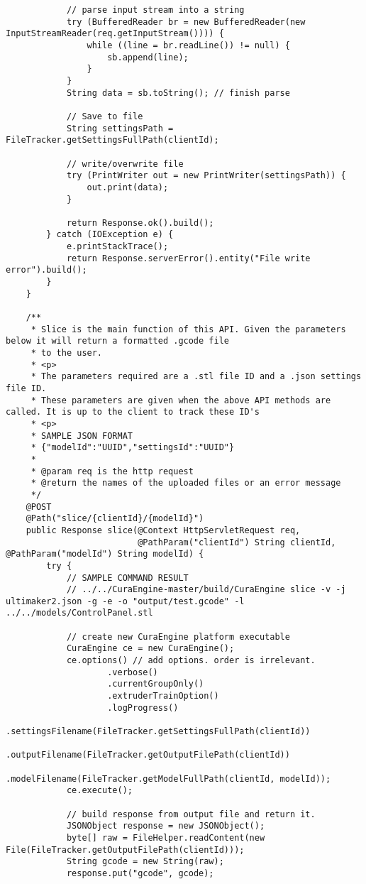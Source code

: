 \begin{lstlisting}
            // parse input stream into a string
            try (BufferedReader br = new BufferedReader(new InputStreamReader(req.getInputStream()))) {
                while ((line = br.readLine()) != null) {
                    sb.append(line);
                }
            }
            String data = sb.toString(); // finish parse

            // Save to file
            String settingsPath = FileTracker.getSettingsFullPath(clientId);

            // write/overwrite file
            try (PrintWriter out = new PrintWriter(settingsPath)) {
                out.print(data);
            }

            return Response.ok().build();
        } catch (IOException e) {
            e.printStackTrace();
            return Response.serverError().entity("File write error").build();
        }
    }

    /**
     * Slice is the main function of this API. Given the parameters below it will return a formatted .gcode file
     * to the user.
     * <p>
     * The parameters required are a .stl file ID and a .json settings file ID.
     * These parameters are given when the above API methods are called. It is up to the client to track these ID's
     * <p>
     * SAMPLE JSON FORMAT
     * {"modelId":"UUID","settingsId":"UUID"}
     *
     * @param req is the http request
     * @return the names of the uploaded files or an error message
     */
    @POST
    @Path("slice/{clientId}/{modelId}")
    public Response slice(@Context HttpServletRequest req,
                          @PathParam("clientId") String clientId, @PathParam("modelId") String modelId) {
        try {
            // SAMPLE COMMAND RESULT
            // ../../CuraEngine-master/build/CuraEngine slice -v -j ultimaker2.json -g -e -o "output/test.gcode" -l ../../models/ControlPanel.stl

            // create new CuraEngine platform executable
            CuraEngine ce = new CuraEngine();
            ce.options() // add options. order is irrelevant.
                    .verbose()
                    .currentGroupOnly()
                    .extruderTrainOption()
                    .logProgress()
                    .settingsFilename(FileTracker.getSettingsFullPath(clientId))
                    .outputFilename(FileTracker.getOutputFilePath(clientId))
                    .modelFilename(FileTracker.getModelFullPath(clientId, modelId));
            ce.execute();

            // build response from output file and return it.
            JSONObject response = new JSONObject();
            byte[] raw = FileHelper.readContent(new File(FileTracker.getOutputFilePath(clientId)));
            String gcode = new String(raw);
            response.put("gcode", gcode);


\end{lstlisting}
